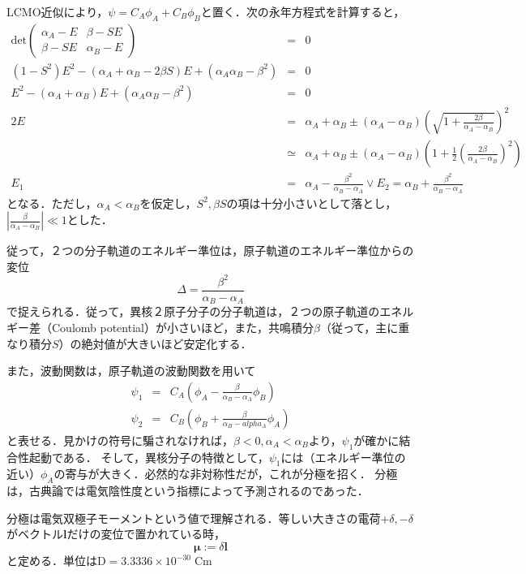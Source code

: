 \documentclass[uplatex, dvipdfmx]{jsreport}
\begin{document}
LCMO近似により，$\psi=C_A\phi_A+C_B\phi_B$と置く．次の永年方程式を計算すると，
\begin{eqnarray*}
\mathrm{det}\left(\begin{array}{cc}\alpha_A-E &\beta-SE \\ \beta-SE & \alpha_B-E \end{array}\right) &=& 0 \\
(1-S^2)E^2-(\alpha_A+\alpha_B-2\beta S)E+(\alpha_A\alpha_B-\beta^2)&=& 0 \\
E^2-(\alpha_A+\alpha_B)E+(\alpha_A\alpha_B-\beta^2)&=& 0\\
2E&=&\alpha_A+\alpha_B\pm(\alpha_A-\alpha_B)\left(\sqrt{1+\frac{2\beta}{\alpha_A-\alpha_B}}\right)^2 \\
&\simeq & \alpha_A+\alpha_B\pm(\alpha_A-\alpha_B)\left( 1+\frac{1}{2}\left( \frac{2\beta}{\alpha_A-\alpha_B} \right)^2 \right) \\
E_1 &=& \alpha_A-\frac{\beta^2}{\alpha_B-\alpha_A} \lor E_2=\alpha_B+\frac{\beta^2}{\alpha_B-\alpha_A}
\end{eqnarray*}
となる．ただし，$\alpha_A<\alpha_B$を仮定し，$S^2,\beta S$の項は十分小さいとして落とし，$\left| \frac{\beta}{\alpha_A-\alpha_B} \right|\ll 1$とした．

従って，２つの分子軌道のエネルギー準位は，原子軌道のエネルギー準位からの変位
\[ \Delta=\frac{\beta^2}{\alpha_B-\alpha_A} \]
で捉えられる．従って，異核２原子分子の分子軌道は，２つの原子軌道のエネルギー差（Coulomb potential）が小さいほど，また，共鳴積分$\beta$（従って，主に重なり積分$S$）の絶対値が大きいほど安定化する．

また，波動関数は，原子軌道の波動関数を用いて
\begin{eqnarray*}
    \psi_1&=&C_A\left( \phi_A-\frac{\beta}{\alpha_B-\alpha_A}\phi_B \right) \\
    \psi_2&=&C_B\left( \phi_B+\frac{\beta}{\alpha_B-alpha_A}\phi_A \right)
\end{eqnarray*}
と表せる．見かけの符号に騙されなければ，$\beta<0,\alpha_A<\alpha_B$より，$\psi_1$が確かに結合性起動である．
そして，異核分子の特徴として，$\psi_1$には（エネルギー準位の近い）$\phi_A$の寄与が大きく．必然的な非対称性だが，これが分極を招く．
分極は，古典論では電気陰性度という指標によって予測されるのであった．

\begin{definition}[電気双極子モーメント]
    分極は電気双極子モーメントという値で理解される．等しい大きさの電荷$+\delta,-\delta$がベクトル$\mathbf{l}$だけの変位で置かれている時，
    \[ \mathbf{\mu}:=\delta\mathbf{l} \]
    と定める．単位は$\mathrm{D}=3.3336\times 10^{-30}\;\mathrm{Cm}$
\end{definition}
\end{document}
